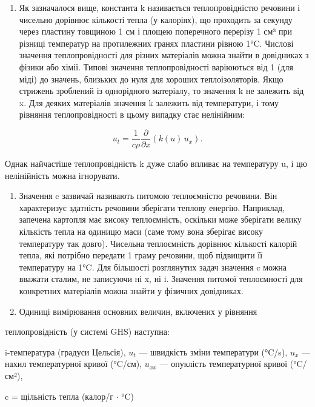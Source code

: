 \documentclass[
  ukrainian,
]{article}
\providecommand{\tightlist}{%
  \setlength{\itemsep}{0pt}\setlength{\parskip}{0pt}}
\begin{document}
\begin{enumerate}
\def\labelenumi{\arabic{enumi}.}
\tightlist
\item
  Як зазначалося вище, константа k називається теплопровідністю речовини
  і чисельно дорівнює кількості тепла (у калоріях), що проходить за
  секунду через пластину товщиною 1 см і площею поперечного перерізу 1
  см³ при різниці температур на протилежних гранях пластини рівною 1°C.
  Числові значення теплопровідності для різних матеріалів можна знайти в
  довідниках з фізики або хімії. Типові значення теплопровідності
  варіюються від 1 (для міді) до значень, близьких до нуля для хороших
  теплоізоляторів. Якщо стрижень зроблений із однорідного матеріалу, то
  значення k не залежить від x. Для деяких матеріалів значення k
  залежить від температури, і тому рівняння теплопровідності в цьому
  випадку стає нелінійним:
\end{enumerate}

\[
u_{t} = \frac{1}{c\rho} \frac{\partial}{\partial x}\left(k(u)\,u_{x}\right).
\]

Однак найчастіше теплопровідність k дуже слабо впливає на температуру u,
і цю нелінійність можна ігнорувати.

\begin{enumerate}
\def\labelenumi{\arabic{enumi}.}
\setcounter{enumi}{1}
\item
  Значення c зазвичай називають питомою теплоємністю речовини. Він
  характеризує здатність речовини зберігати теплову енергію. Наприклад,
  запечена картопля має високу теплоємність, оскільки може зберігати
  велику кількість тепла на одиницю маси (саме тому вона зберігає високу
  температуру так довго). Чисельна теплоємність дорівнює кількості
  калорій тепла, які потрібно передати 1 граму речовини, щоб підвищити
  її температуру на 1°C. Для більшості розглянутих задач значення c
  можна вважати сталим, не записуючи ні x, ні i. Значення питомої
  теплоємності для конкретних матеріалів можна знайти у фізичних
  довідниках.
\item
  Одиниці вимірювання основних величин, включених у рівняння
\end{enumerate}

теплопровідність (у системі GHS) наступна:

i-температура (градуси Цельсія), \(u_t\) --- швидкість зміни температури
(°C/s), \(u_x\) --- нахил температурної кривої (°C/см), \(u_{xx}\) ---
опуклість температурної кривої (°C/см²),

c = щільність тепла (калор/г \(\cdot\) °C)
\end{document}
